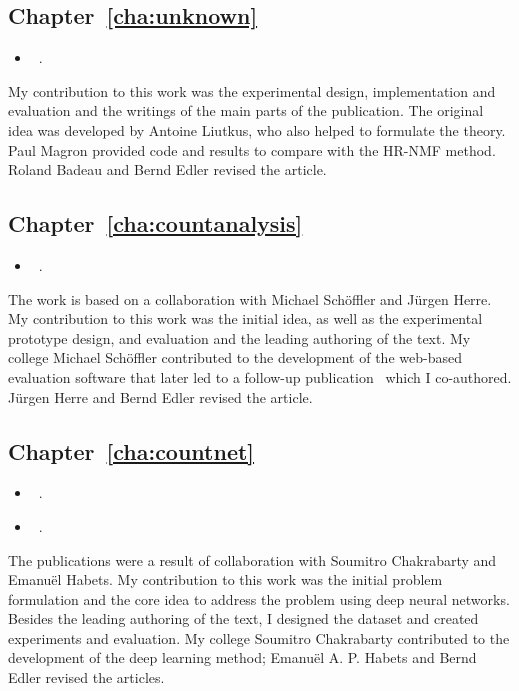 \subsection*{Chapter~\ref{cha:unknown}}

\begin{itemize}
  \item[\cite{stoeter16}] ~.
\end{itemize}
\noindent
My contribution to this work was the experimental design, implementation and evaluation and the writings of the main parts of the publication.
The original idea was developed by Antoine Liutkus, who also helped to formulate the theory. Paul Magron provided code and results to compare with the HR-NMF method. Roland Badeau and Bernd Edler revised the article.

\subsection*{Chapter~\ref{cha:countanalysis}}

\begin{itemize}
  \item[\cite{stoeter13}] ~.
\end{itemize}
\noindent
The work is based on a collaboration with Michael Schöffler and Jürgen Herre.
My contribution to this work was the initial idea, as well as the experimental prototype design, and evaluation and the leading authoring of the text.
My college Michael Schöffler contributed to the development of the web-based evaluation software that later led to a follow-up publication~\cite{schoeffler13} which I co-authored. Jürgen Herre and Bernd Edler revised the article.

\subsection*{Chapter~\ref{cha:countnet}}

\begin{itemize}
  \item[\cite{stoeter19}] ~.
  \item[\cite{stoeter18}] ~.
\end{itemize}
\noindent
The publications were a result of collaboration with Soumitro Chakrabarty and Emanuël Habets. 
My contribution to this work was the initial problem formulation and the core idea to address the problem using deep neural networks. Besides the leading authoring of the text, I designed the dataset and created experiments and evaluation. 
My college Soumitro Chakrabarty contributed to the development of the deep learning method; Emanuël A. P. Habets and Bernd Edler revised the articles.


